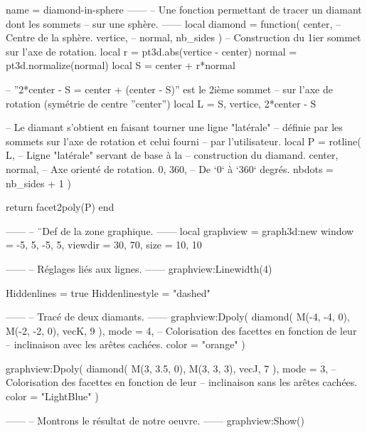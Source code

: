 \documentclass{standalone}
\begin{document}
\begin{luadraw}{name = diamond-in-sphere}
------
-- Une fonction permettant de tracer un diamant dont les sommets
-- sur une sphère.
------
local diamond = function(
  center,   -- Centre de la sphère.
  vertice,  --
  normal,
  nb_sides
)
-- Construction du 1ier sommet sur l'axe de rotation.
  local r = pt3d.abs(vertice - center)
  normal  = pt3d.normalize(normal)
  local S = center + r*normal

-- ''2*center - S = center + (center - S)'' est le 2ième sommet
-- sur l'axe de rotation (symétrie de centre ''center'')
  local L = {S, vertice, 2*center - S}

-- Le diamant s'obtient en faisant tourner une ligne "latérale"
-- définie par les sommets sur l'axe de rotation et celui fourni
-- par l'utilisateur.
  local P = rotline(
    L,                 -- Ligne "latérale" servant de base à la
                       -- construction du diamand.
    {center, normal},  -- Axe orienté de rotation.
    0, 360,            -- De `0` à `360` degrés.
    {nbdots = nb_sides + 1}
  )

  return facet2poly(P)
end

------
-- ¨Def de la zone graphique.
------
local graphview = graph3d:new{
  window  = {-5, 5, -5, 5},
  viewdir = {30, 70},
  size    = {10, 10}
}

------
-- Réglages liés aux lignes.
------
graphview:Linewidth(4)

Hiddenlines     = true
Hiddenlinestyle = "dashed"

------
-- Tracé de deux diamants.
------
graphview:Dpoly(
  diamond(
    M(-4, -4, 0), M(-2, -2, 0), vecK,
    9
  ),
  {
    mode  = 4,  -- Colorisation des facettes en fonction de leur
                -- inclinaison avec les arêtes cachées.
    color = "orange"
  }
)

graphview:Dpoly(
  diamond(
    M(3, 3.5, 0), M(3, 3, 3), vecJ,
    7
  ),
  {
    mode  = 3,  -- Colorisation des facettes en fonction de leur
                -- inclinaison sans les arêtes cachées.
    color = "LightBlue"
  }
)

------
-- Montrons le résultat de notre oeuvre.
------
graphview:Show()
\end{luadraw}
\end{document}
